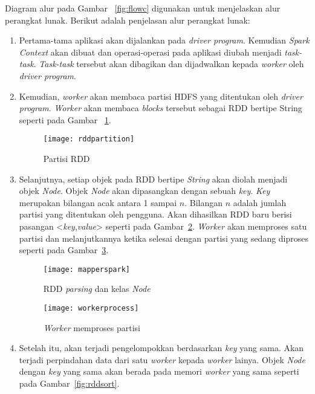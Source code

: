 Diagram alur pada Gambar ~\ref{fig:flowc} digunakan untuk menjelaskan alur perangkat lunak. Berikut adalah penjelasan alur perangkat lunak:

\begin{enumerate}

\item Pertama-tama aplikasi akan dijalankan pada \textit{driver program}. Kemudian \textit{Spark Context} akan dibuat dan operasi-operasi pada aplikasi diubah menjadi \textit{task-task}. \textit{Task-task} tersebut akan dibagikan dan dijadwalkan kepada \textit{worker} oleh \textit{driver program}. 


\item Kemudian, \textit{worker} akan membaca partisi HDFS yang ditentukan oleh \textit{driver program}. \textit{Worker} akan membaca \textit{blocks} tersebut sebagai RDD bertipe String seperti pada Gambar ~\ref{fig:rddpartition}. 

\begin{figure}[H]
    \centering  
    \texttt{[image: rddpartition]}  
    \caption[Partisi RDD]{Partisi RDD} 
    \label{fig:rddpartition} 
\end{figure}

\item Selanjutnya, setiap objek pada RDD bertipe \textit{String} akan diolah menjadi objek \textit{Node}. Objek \textit{Node} akan dipasangkan dengan sebuah \textit{key}. \textit{Key} merupakan bilangan acak antara 1 sampai $n$. Bilangan $n$ adalah jumlah partisi yang ditentukan oleh pengguna. Akan dihasilkan RDD baru berisi pasangan <\textit{key},\textit{value}> seperti pada Gambar~\ref{fig:mapperspark}. \textit{Worker} akan memproses satu partisi dan melanjutkannya ketika selesai dengan partisi yang sedang diproses seperti pada Gambar~\ref{fig:workerprocess}.

\begin{figure}[H]
    \centering  
    \texttt{[image: mapperspark]}  
    \caption[RDD \textit{parsing} dan kelas \textit{Node}]{RDD \textit{parsing} dan kelas \textit{Node}} 
    \label{fig:mapperspark}
\end{figure}

\begin{figure}[H]
    \centering  
    \texttt{[image: workerprocess]}  
    \caption[\textit{Worker} memproses partisi]{\textit{Worker} memproses partisi} 
    \label{fig:workerprocess} 
\end{figure}


\item Setelah itu, akan terjadi pengelompokkan berdasarkan \textit{key} yang sama. Akan terjadi perpindahan data dari satu \textit{worker} kepada \textit{worker} lainya. Objek \textit{Node} dengan \textit{key} yang sama akan berada pada memori \textit{worker} yang sama seperti pada Gambar~\ref{fig:rddsort}.


\end{enumerate}
